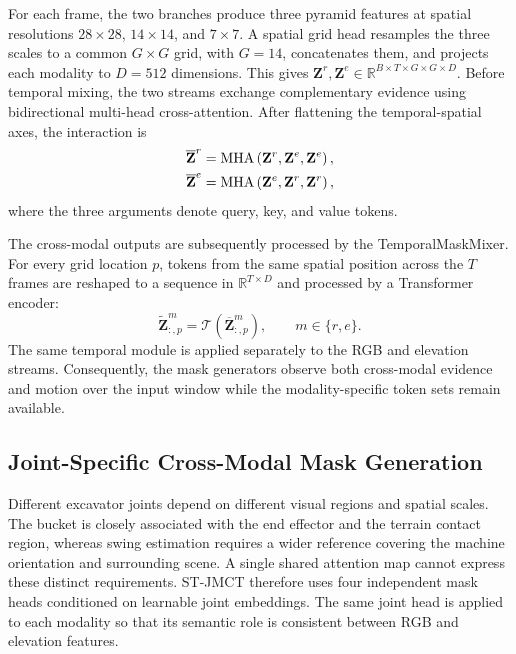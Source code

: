 \documentclass[journal]{IEEEtran}
\begin{document}
For each frame, the two branches produce three pyramid features at spatial
resolutions $28\times28$, $14\times14$, and $7\times7$. A spatial grid head
resamples the three scales to a common $G\times G$ grid, with $G=14$,
concatenates them, and projects each modality to $D=512$ dimensions. This
gives $\mathbf{Z}^{r},\mathbf{Z}^{e}\in
\mathbb{R}^{B\times T\times G\times G\times D}$. Before temporal mixing, the
two streams exchange complementary evidence using bidirectional multi-head
cross-attention. After flattening the temporal-spatial axes, the interaction is
\begin{align}
\overline{\mathbf{Z}}^{r} &={\rm MHA}
\left(\mathbf{Z}^{r},\mathbf{Z}^{e},\mathbf{Z}^{e}\right), \\
\overline{\mathbf{Z}}^{e} &={\rm MHA}
\left(\mathbf{Z}^{e},\mathbf{Z}^{r},\mathbf{Z}^{r}\right),
\label{eq:cross_modal}
\end{align}
where the three arguments denote query, key, and value tokens.

The cross-modal outputs are subsequently processed by the TemporalMaskMixer.
For every grid location $p$, tokens from the same spatial position across the
$T$ frames are reshaped to a sequence in
$\mathbb{R}^{T\times D}$ and processed by a Transformer encoder:
\begin{equation}
\widetilde{\mathbf{Z}}^{m}_{:,p}=
\mathcal{T}\!\left(\overline{\mathbf{Z}}^{m}_{:,p}\right),
\qquad m\in\{r,e\}.
\label{eq:temporal_mixer}
\end{equation}
The same temporal module is applied separately to the RGB and elevation
streams. Consequently, the mask generators observe both cross-modal evidence
and motion over the input window while the modality-specific token sets remain
available.

\subsection{Joint-Specific Cross-Modal Mask Generation}
\label{subsec:joint_masks}

Different excavator joints depend on different visual regions and spatial
scales. The bucket is closely associated with the end effector and the terrain
contact region, whereas swing estimation requires a wider reference covering
the machine orientation and surrounding scene. A single shared attention map
cannot express these distinct requirements. ST-JMCT therefore uses four
independent mask heads conditioned on learnable joint embeddings. The same
joint head is applied to each modality so that its semantic role is consistent
between RGB and elevation features.
\end{document}
